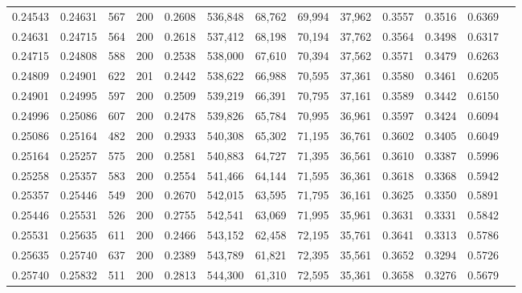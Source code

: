 \begin{tabular}{rrrrrrrrrrrrr}
0.24543 & 0.24631 &   567 & 200 &                                     0.2608 & 536,848 &  68,762 &  69,994 &  37,962 & 0.3557 & 0.3516 & 0.6369 \\
0.24631 & 0.24715 &   564 & 200 &                                     0.2618 & 537,412 &  68,198 &  70,194 &  37,762 & 0.3564 & 0.3498 & 0.6317 \\
0.24715 & 0.24808 &   588 & 200 &                                     0.2538 & 538,000 &  67,610 &  70,394 &  37,562 & 0.3571 & 0.3479 & 0.6263 \\
0.24809 & 0.24901 &   622 & 201 &                                     0.2442 & 538,622 &  66,988 &  70,595 &  37,361 & 0.3580 & 0.3461 & 0.6205 \\
0.24901 & 0.24995 &   597 & 200 &                                     0.2509 & 539,219 &  66,391 &  70,795 &  37,161 & 0.3589 & 0.3442 & 0.6150 \\
0.24996 & 0.25086 &   607 & 200 &                                     0.2478 & 539,826 &  65,784 &  70,995 &  36,961 & 0.3597 & 0.3424 & 0.6094 \\
0.25086 & 0.25164 &   482 & 200 &                                     0.2933 & 540,308 &  65,302 &  71,195 &  36,761 & 0.3602 & 0.3405 & 0.6049 \\
0.25164 & 0.25257 &   575 & 200 &                                     0.2581 & 540,883 &  64,727 &  71,395 &  36,561 & 0.3610 & 0.3387 & 0.5996 \\
0.25258 & 0.25357 &   583 & 200 &                                     0.2554 & 541,466 &  64,144 &  71,595 &  36,361 & 0.3618 & 0.3368 & 0.5942 \\
0.25357 & 0.25446 &   549 & 200 &                                     0.2670 & 542,015 &  63,595 &  71,795 &  36,161 & 0.3625 & 0.3350 & 0.5891 \\
0.25446 & 0.25531 &   526 & 200 &                                     0.2755 & 542,541 &  63,069 &  71,995 &  35,961 & 0.3631 & 0.3331 & 0.5842 \\
0.25531 & 0.25635 &   611 & 200 &                                     0.2466 & 543,152 &  62,458 &  72,195 &  35,761 & 0.3641 & 0.3313 & 0.5786 \\
0.25635 & 0.25740 &   637 & 200 &                                     0.2389 & 543,789 &  61,821 &  72,395 &  35,561 & 0.3652 & 0.3294 & 0.5726 \\
0.25740 & 0.25832 &   511 & 200 &                                     0.2813 & 544,300 &  61,310 &  72,595 &  35,361 & 0.3658 & 0.3276 & 0.5679 \\

\end{tabular}
